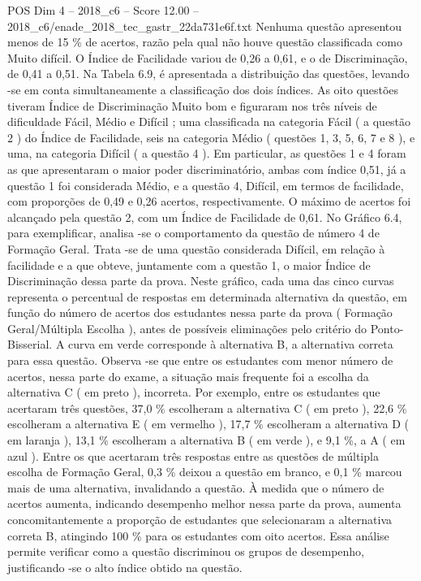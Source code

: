 \begin{textsample}{POS Dim 4 – 2018\_c6 – Score 12.00 – 2018\_c6/enade\_2018\_tec\_gastr\_22da731e6f.txt}
Nenhuma questão apresentou menos de 15 \% de acertos, razão pela qual não houve questão classificada como Muito difícil.
O Índice de Facilidade variou de 0,26 a 0,61, e o de Discriminação, de 0,41 a 0,51.
Na Tabela 6.9, é apresentada a distribuição das questões, levando -se em conta simultaneamente a classificação dos dois índices.
As oito questões tiveram Índice de Discriminação Muito bom e figuraram nos três níveis de dificuldade Fácil, Médio e Difícil ; uma classificada na categoria Fácil ( a questão 2 ) do Índice de Facilidade, seis na categoria Médio ( questões 1, 3, 5, 6, 7 e 8 ), e uma, na categoria Difícil ( a questão 4 ).
Em particular, as questões 1 e 4 foram as que apresentaram o maior poder discriminatório, ambas com índice 0,51, já a questão 1 foi considerada Médio, e a questão 4, Difícil, em termos de facilidade, com proporções de 0,49 e 0,26 acertos, respectivamente.
O máximo de acertos foi alcançado pela questão 2, com um Índice de Facilidade de 0,61.
No Gráfico 6.4, para exemplificar, analisa -se o comportamento da questão de número 4 de Formação Geral.
Trata -se de uma questão considerada Difícil, em relação à facilidade e a que obteve, juntamente com a questão 1, o maior Índice de Discriminação dessa parte da prova.
Neste gráfico, cada uma das cinco curvas representa o percentual de respostas em determinada alternativa da questão, em função do número de acertos dos estudantes nessa parte da prova ( Formação Geral/Múltipla Escolha ), antes de possíveis eliminações pelo critério do Ponto-Bisserial.
A curva em verde corresponde à alternativa B, a alternativa correta para essa questão.
Observa -se que entre os estudantes com menor número de acertos, nessa parte do exame, a situação mais frequente foi a escolha da alternativa C ( em preto ), incorreta.
Por exemplo, entre os estudantes que acertaram três questões, 37,0 \% escolheram a alternativa C ( em preto ), 22,6 \% escolheram a alternativa E ( em vermelho ), 17,7 \% escolheram a alternativa D ( em laranja ), 13,1 \% escolheram a alternativa B ( em verde ), e 9,1 \%, a A ( em azul ).
Entre os que acertaram três respostas entre as questões de múltipla escolha de Formação Geral, 0,3 \% deixou a questão em branco, e 0,1 \% marcou mais de uma alternativa, invalidando a questão.
À medida que o número de acertos aumenta, indicando desempenho melhor nessa parte da prova, aumenta concomitantemente a proporção de estudantes que selecionaram a alternativa correta B, atingindo 100 \% para os estudantes com oito acertos.
Essa análise permite verificar como a questão discriminou os grupos de desempenho, justificando -se o alto índice obtido na questão.

\end{textsample}
